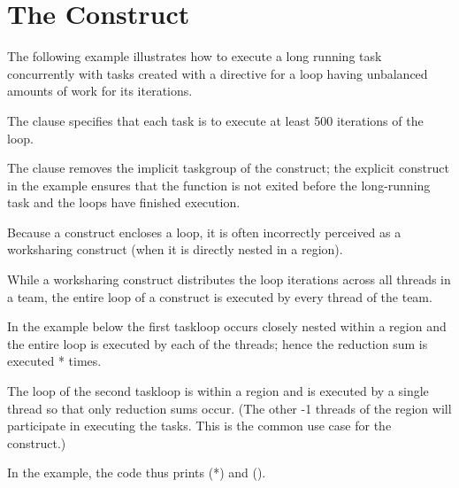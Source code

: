 \pagebreak
\section{The  Construct}
\label{sec:taskloop}

The following example illustrates how to execute a long running task concurrently with tasks created
with a  directive for a loop having unbalanced amounts of work for its iterations.

The  clause specifies that each task is to execute at least 500 iterations of the loop. 

The  clause removes the implicit taskgroup of the  construct; the explicit  construct in the example ensures that the function is not exited before the long-running task and the loops have finished execution.




Because a  construct encloses a loop, it is often incorrectly 
perceived as a worksharing construct (when it is directly nested in 
a  region).

While a worksharing construct distributes the loop iterations across all threads in a team,
the entire loop of a  construct is executed by every thread of the team.

In the example below the first taskloop occurs closely nested within 
a  region and the entire loop is executed by each of the  threads; 
hence the reduction sum is executed * times.
 
The loop of the second taskloop is within a  region and is executed
by a single thread so that only  reduction sums occur.  (The other
-1 threads of the  region will participate in executing the 
tasks. This is the common use case for the  construct.)

In the example, the code thus prints  (*) and 
 ().


